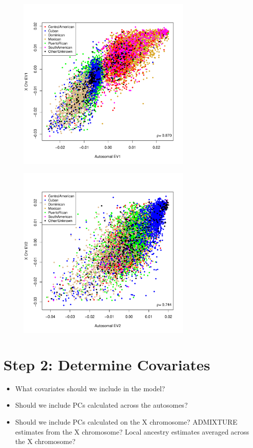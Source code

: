 \documentclass{beamer}
\begin{document}
\begin{frame}
\centering
\begin{figure}
\includegraphics[height=8.5cm]{../pca_x_auto_ev1_col.pdf}
\end{figure}
\end{frame}

\begin{frame}
\centering
\begin{figure}
\includegraphics[height=8.5cm]{../pca_x_auto_ev2_col.pdf}
\end{figure}
\end{frame}

\section{Step 2: Determine Covariates}
\begin{frame}%
\begin{itemize}
\item What covariates should we include in the model?
\item Should we include PCs calculated across the autosomes?
\item Should we include PCs calculated on the X chromosome? ADMIXTURE estimates from the X chromosome?
Local ancestry estimates averaged across the X chromosome?
\end{itemize}
\end{frame}
\end{document}
